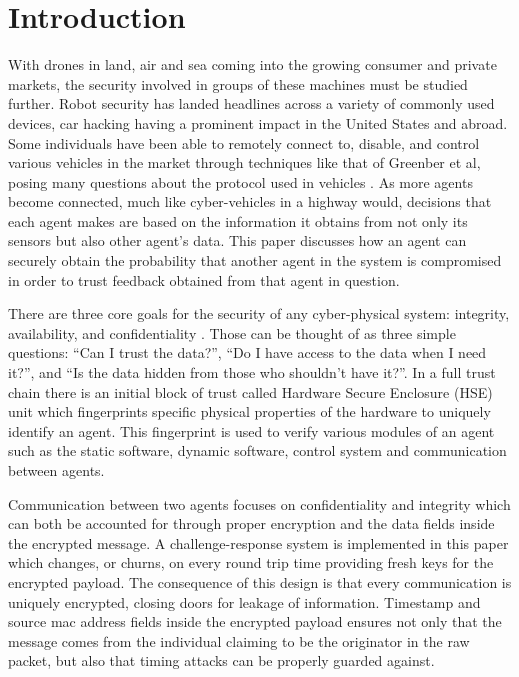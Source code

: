 \documentclass[conference]{IEEEtran}
\begin{document}


%
\IEEEpeerreviewmaketitle

\section{Introduction}
With drones in land, air and sea coming into the growing consumer and private markets, the security involved in groups of these machines must be studied further. Robot security has landed headlines across a variety of commonly used devices, car hacking having a prominent impact in the United States and abroad. Some individuals have been able to remotely connect to, disable, and control various vehicles in the market through techniques like that of Greenber et al, posing many questions about the protocol used in vehicles \cite{greenberg2015hackers}. As more agents become connected, much like cyber-vehicles in a highway would, decisions that each agent makes are based on the information it obtains from not only its sensors but also other agent's data. This paper discusses how an agent can securely obtain the probability that another agent in the system is compromised in order to trust feedback obtained from that agent in question.

There are three core goals for the security of any cyber-physical system: integrity, availability, and confidentiality \cite{Cardenas2008}. Those can be thought of as three simple questions: ``Can I trust the data?'', ``Do I have access to the data when I need it?'', and ``Is the data hidden from those who shouldn't have it?''. In a full trust chain there is an initial block of trust called Hardware Secure Enclosure (HSE) unit which fingerprints specific physical properties of the hardware to uniquely identify an agent. This fingerprint is used to verify various modules of an agent such as the static software, dynamic software, control system and communication between agents.

Communication between two agents focuses on confidentiality and integrity which can both be accounted for through proper encryption and the data fields inside the encrypted message. A challenge-response system is implemented in this paper which changes, or churns, on every round trip time providing fresh keys for the encrypted payload. The consequence of this design is that every communication is uniquely encrypted, closing doors for leakage of information. Timestamp and source mac address fields inside the encrypted payload ensures not only that the message comes from the individual claiming to be the originator in the raw packet, but also that timing attacks can be properly guarded against. 
\end{document}
